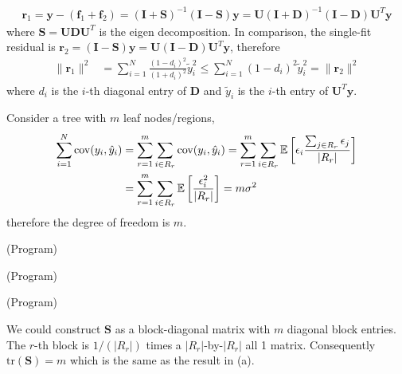 \begin{exercise}
  \begin{align}
    \mathbf{r}_1 = \mathbf{y} - (\mathbf{f}_1 + \mathbf{f}_2) = (\mathbf{I} +
    \mathbf{S})^{-1}(\mathbf{I} - \mathbf{S}) \mathbf{y} = \mathbf{U}
    (\mathbf{I} + \mathbf{D})^{-1} (\mathbf{I} - \mathbf{D})\mathbf{U}^T\mathbf{y}
  \end{align}
  where $\mathbf{S} = \mathbf{UDU}^T$ is the eigen decomposition. In comparison,
  the single-fit residual is $\mathbf{r}_2 =(\mathbf{I} - \mathbf{S}) \mathbf{y}
  = \mathbf{U} (\mathbf{I} - \mathbf{D})\mathbf{U}^T\mathbf{y}$, therefore
  \begin{align}
    \|\mathbf{r}_1 \|^2 &= \sum_{i=1}^N \frac{(1-d_i)^2}{(1+d_i)^2}\tilde{y}_i^2
    \leq \sum_{i=1}^N (1-d_i)^2\tilde{y}_i^2 = \|\mathbf{r}_2 \|^2 
  \end{align}
  where $d_i$ is the $i$-th diagonal entry of $\mathbf{D}$ and $\tilde{y}_i$
  is the $i$-th entry of $\mathbf{U}^T\mathbf{y}$.
\end{exercise}

\begin{exercise}
  \begin{exerciseSection}
    Consider a tree with $m$ leaf nodes/regions,
    \begin{align}
      \sum_{i=1}^N\mbox{cov}(y_i, \hat{y}_i) &= \sum_{r=1}^m \sum_{i\in R_r}
      \mbox{cov}(y_i, \hat{y}_i) = \sum_{r=1}^m \sum_{i\in R_r}
      \mathbb{E}\left[\epsilon_i \frac{\sum_{j\in R_r}\epsilon_j}{|R_r|}\right] \notag\\
      &= \sum_{r=1}^m \sum_{i\in R_r}
      \mathbb{E}\left[\frac{\epsilon_i^2}{|R_r|}\right] = m\sigma^2
    \end{align}
    therefore the degree of freedom is $m$.
  \end{exerciseSection}
  \begin{exerciseSection}
    (Program)
  \end{exerciseSection}
  \begin{exerciseSection}
    (Program)
  \end{exerciseSection}
  \begin{exerciseSection}
    (Program)
  \end{exerciseSection}
  \begin{exerciseSection}
    We could construct $\mathbf{S}$ as a block-diagonal matrix with $m$ diagonal
    block entries. The $r$-th block is $1/(|R_r|)$ times a $|R_r|$-by-$|R_r|$
    all 1 matrix. Consequently $\mbox{tr}(\mathbf{S}) = m$ which is the same as
    the result in (a).
  \end{exerciseSection}
\end{exercise}

\begin{exercise}[(Program)]
\end{exercise}